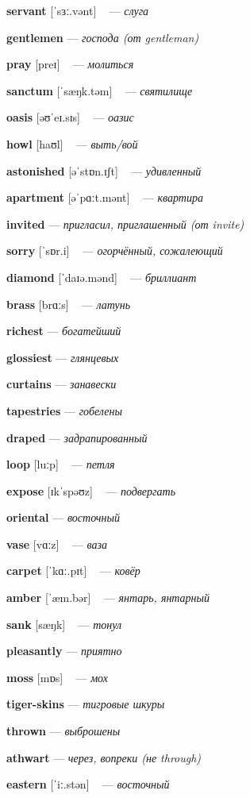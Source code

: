\documentclass[a4paper,oneside,12pt]{amsart}
\begin{document}
{\large 

 {\bf servant } [ˈsɜː.vənt] ~ --- \emph{ слуга }

{\bf gentlemen } --- \emph{ господа (от gentleman) }

{\bf pray } [preɪ] ~ --- \emph{ молиться }

{\bf sanctum } [ˈsæŋk.təm] ~ --- \emph{ святилище }

{\bf oasis } [əʊˈeɪ.sɪs] ~ --- \emph{ оазис }

{\bf howl } [haʊl] ~ --- \emph{ выть/вой }

{\bf astonished } [əˈstɒn.ɪʃt] ~ --- \emph{ удивленный }

{\bf apartment } [əˈpɑːt.mənt] ~ --- \emph{ квартира }

{\bf invited } --- \emph{ пригласил, приглашенный (от invite) }

{\bf sorry } [ˈsɒr.i] ~ --- \emph{ огорчённый, сожалеющий }

{\bf diamond } [ˈdaɪə.mənd] ~ --- \emph{ бриллиант }

{\bf brass } [brɑːs] ~ --- \emph{ латунь }

{\bf richest } --- \emph{ богатейший }

{\bf glossiest } --- \emph{ глянцевых }

{\bf curtains } --- \emph{ занавески }

{\bf tapestries } --- \emph{ гобелены }

{\bf draped } --- \emph{ задрапированный }

{\bf loop } [luːp] ~ --- \emph{ петля }

{\bf expose } [ɪkˈspəʊz] ~ --- \emph{ подвергать }

{\bf oriental } --- \emph{ восточный }

{\bf vase } [vɑːz] ~ --- \emph{ ваза }

{\bf carpet } [ˈkɑː.pɪt] ~ --- \emph{ ковёр }

{\bf amber } [ˈæm.bər] ~ --- \emph{ янтарь, янтарный }

{\bf sank } [sæŋk] ~ --- \emph{ тонул }

{\bf pleasantly } --- \emph{ приятно }

{\bf moss } [mɒs] ~ --- \emph{ мох }

{\bf tiger-skins } --- \emph{ тигровые шкуры }

{\bf thrown } --- \emph{ выброшены }

{\bf athwart } --- \emph{ через, вопреки (не through) }

{\bf eastern } [ˈiː.stən] ~ --- \emph{ восточный }

}
\end{document}
